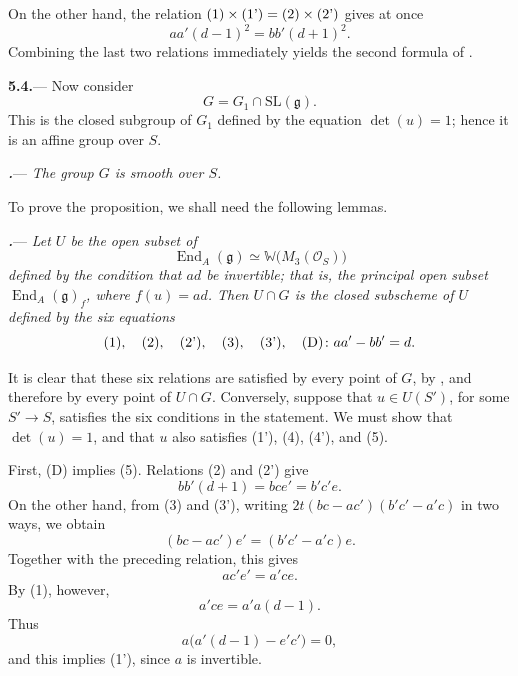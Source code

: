
On the other hand, the relation
\(\textup{(1)}\times\textup{(1')}=
\textup{(2)}\times\textup{(2')}\) gives at once
\[
  aa'(d-1)^2=bb'(d+1)^2.
\]
Combining the last two relations immediately yields the second
formula of .

\par\medskip\noindent
\textbf{5.4.}---
Now consider
\[
  G=G_1\cap\mathrm{SL}(\mathfrak g).
\]
This is the closed subgroup of \(G_1\) defined by the equation
\(\det(u)=1\); hence it is an affine group over \(S\).

\par\medskip\noindent
{}\textbf{\textit{.}}---
\textit{The group \(G\) is smooth over \(S\).}

To prove the proposition, we shall need the following lemmas.

\par\medskip\noindent
\textbf{\textit{.}}---
\textit{Let \(U\) be the open subset of}
\[
  \operatorname{End}_A(\mathfrak g)
  \simeq
  \mathbb W\bigl(M_3(\mathcal O_S)\bigr)
\]
\textit{defined by the condition that \(ad\) be invertible; that is,
the principal open subset
\(\operatorname{End}_A(\mathfrak g)_f\), where
\(f(u)=ad\).  Then \(U\cap G\) is the closed subscheme of \(U\)
defined by the six equations}
\[
  \textup{(1)},\quad
  \textup{(2)},\quad
  \textup{(2')},\quad
  \textup{(3)},\quad
  \textup{(3')},\quad
  \textup{(D)}\colon aa'-bb'=d.
\]

It is clear that these six relations are satisfied by every point
of \(G\), by , and therefore by every point of \(U\cap G\).
Conversely, suppose that \(u\in U(S')\), for some \(S'\to S\),
satisfies the six conditions in the statement.  We must show that
\(\det(u)=1\), and that \(u\) also satisfies \textup{(1')},
\textup{(4)}, \textup{(4')}, and \textup{(5)}.

First, \textup{(D)} implies \textup{(5)}.  Relations \textup{(2)}
and \textup{(2')} give
\[
  bb'(d+1)=bce'=b'c'e.
\]
On the other hand, from \textup{(3)} and \textup{(3')}, writing
\(2t(bc-ac')(b'c'-a'c)\) in two ways, we obtain
\[
  (bc-ac')e'=(b'c'-a'c)e.
\]
Together with the preceding relation, this gives
\[
  ac'e'=a'ce.
\]
By \textup{(1)}, however,
\[
  a'ce=a'a(d-1).
\]
Thus
\[
  a\bigl(a'(d-1)-e'c'\bigr)=0,
\]
and this implies \textup{(1')}, since \(a\) is invertible.

